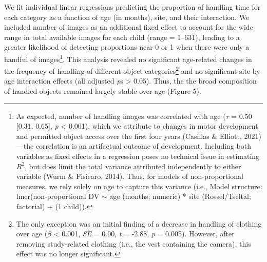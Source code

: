 \documentclass[10pt, letterpaper]{article}
\begin{document}
We fit individual linear regressions predicting the proportion of
handling time for each category as a function of age (in months), site,
and their interaction. We included number of images as an additional
fixed effect to account for the wide range in total available images for
each child (range = 1--631), leading to a greater likelihood of
detecting proportions near 0 or 1 when there were only a handful of
images\footnote{As expected, number of handling images was correlated
  with age (\emph{r} = 0.50 {[}0.31, 0.65{]}, \emph{p} \textless{}
  0.001), which we attribute to changes in motor development and
  permitted object access over the first four years (Casillas \&
  Elliott, 2021)---the correlation is an artifactual outcome of
  development. Including both variables as fixed effects in a regression
  poses no technical issue in estimating \(R^{2}\), but does limit the
  total variance attributed independently to either variable (Wurm \&
  Fisicaro, 2014). Thus, for models of non-proportional measures, we
  rely solely on age to capture this variance (i.e., Model structure:
  lmer(non-proportional DV \({\sim}\) age (months; numeric) * site
  (Rossel/Tseltal; factorial) + (1 \textbar{} child)).}. This analysis
revealed no significant age-related changes in the frequency of handling
of different object categories\footnote{The only exception was an
  initial finding of a decrease in handling of clothing over age
  (\(\beta\) \textless{} 0.001, \emph{SE} = 0.00, \emph{t} = -2.88,
  \emph{p} = 0.005). However, after removing study-related clothing
  (i.e., the vest containing the camera), this effect was no longer
  significant.} and no significant site-by-age interaction effects (all
adjusted \emph{p}s \textgreater{} 0.05). Thus, the the broad composition
of handled objects remained largely stable over age (Figure 5).
\end{document}
